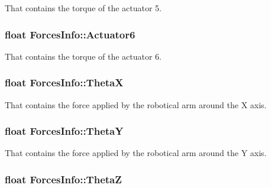 That contains the torque of the actuator 5. 

\subsubsection[{\texorpdfstring{Actuator6}{Actuator6}}]{\setlength{\rightskip}{0pt plus 5cm}float Forces\+Info\+::\+Actuator6}\hypertarget{struct_forces_info_a501ce0b0d8ea6b22ddd7f140bfa32775}{}\label{struct_forces_info_a501ce0b0d8ea6b22ddd7f140bfa32775}


That contains the torque of the actuator 6. 

\subsubsection[{\texorpdfstring{ThetaX}{ThetaX}}]{\setlength{\rightskip}{0pt plus 5cm}float Forces\+Info\+::\+ThetaX}\hypertarget{struct_forces_info_aafb194d559f4df6f76bb07194adb246c}{}\label{struct_forces_info_aafb194d559f4df6f76bb07194adb246c}


That contains the force applied by the robotical arm around the X axis. 

\subsubsection[{\texorpdfstring{ThetaY}{ThetaY}}]{\setlength{\rightskip}{0pt plus 5cm}float Forces\+Info\+::\+ThetaY}\hypertarget{struct_forces_info_a4a2161c051b9d21e3403d387f437aba8}{}\label{struct_forces_info_a4a2161c051b9d21e3403d387f437aba8}


That contains the force applied by the robotical arm around the Y axis. 

\subsubsection[{\texorpdfstring{ThetaZ}{ThetaZ}}]{\setlength{\rightskip}{0pt plus 5cm}float Forces\+Info\+::\+ThetaZ}\hypertarget{struct_forces_info_aabc71dcad8ea42fc58399c9cbde56fd0}{}\label{struct_forces_info_aabc71dcad8ea42fc58399c9cbde56fd0}


